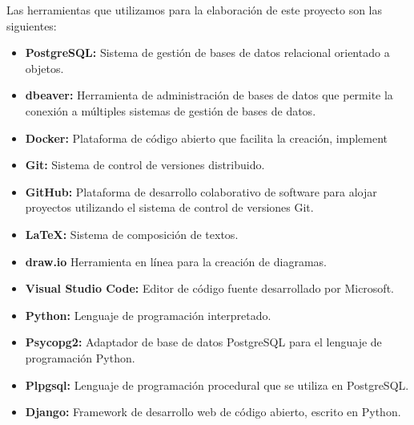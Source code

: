 Las herramientas que utilizamos para la elaboración de este proyecto son las siguientes:
\begin{itemize}
    \item \textbf{PostgreSQL:} Sistema de gestión de bases de datos relacional orientado a objetos.
    \item \textbf{dbeaver:} Herramienta de administración de bases de datos que permite la conexión a múltiples sistemas de gestión de bases de datos.
    \item \textbf{Docker:} Plataforma de código abierto que facilita la creación, implement
    \item \textbf{Git:} Sistema de control de versiones distribuido.
    \item \textbf{GitHub:} Plataforma de desarrollo colaborativo de software para alojar proyectos utilizando el sistema de control de versiones Git.
    \item \textbf{LaTeX:} Sistema de composición de textos.
    \item \textbf{draw.io} Herramienta en línea para la creación de diagramas.
    \item \textbf{Visual Studio Code:} Editor de código fuente desarrollado por Microsoft.
    \item \textbf{Python:} Lenguaje de programación interpretado.
    \item \textbf{Psycopg2:} Adaptador de base de datos PostgreSQL para el lenguaje de programación Python.
    \item \textbf{Plpgsql:} Lenguaje de programación procedural que se utiliza en PostgreSQL.
    \item \textbf{Django:} Framework de desarrollo web de código abierto, escrito en Python.
\end{itemize}